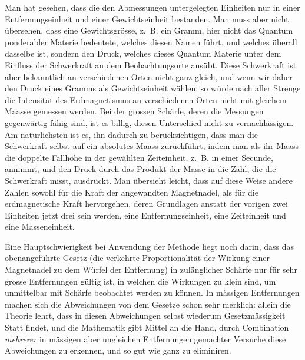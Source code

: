 Man hat gesehen, dass die den Abmessungen untergelegten Einheiten nur in einer Entfernungseinheit und einer Gewichtseinheit bestanden. Man muss aber nicht übersehen, dass eine Gewichtsgrösse, z.~B. ein Gramm, hier nicht das Quantum ponderabler Materie bedeutete, welches diesen Namen führt, und welches überall dasselbe ist, sondern den Druck, welches dieses Quantum Materie unter dem Einfluss der Schwerkraft an dem Beobachtungsorte ausübt. Diese Schwerkraft ist aber bekanntlich an verschiedenen Orten nicht ganz gleich, und wenn wir daher den Druck eines Gramms als Gewichtseinheit wählen, so würde nach aller Strenge die Intensität des Erdmagnetismus an verschiedenen Orten nicht mit gleichem Maasse gemessen werden. Bei der grossen Schärfe, deren die Messungen gegenwärtig fähig sind, ist es billig, diesen Unterschied nicht zu vernachlässigen. Am natürlichsten ist es, ihn dadurch zu berücksichtigen, dass man die Schwerkraft selbst auf ein absolutes Maass zurückführt, indem man als ihr Maass die doppelte Fallhöhe in der gewählten Zeiteinheit, z.~B. in einer Secunde, annimmt, und den Druck durch das Produkt der Masse in die Zahl, die die Schwerkraft misst, ausdrückt. Man übersieht leicht, dass auf diese Weise andere Zahlen sowohl für die Kraft der angewandten Magnetnadel, als für die erdmagnetische Kraft hervorgehen, deren Grundlagen anstatt der vorigen zwei Einheiten jetzt drei sein werden, eine Entfernungseinheit, eine Zeiteinheit und eine Masseneinheit.

\GaussVSourceGathering{42\textsuperscript{*}}
\par\clearpage
{}
Eine Hauptschwierigkeit bei Anwendung der Methode liegt noch darin, dass das obenangeführte Gesetz (die verkehrte Proportionalität der Wirkung einer Magnetnadel zu dem Würfel der Entfernung) in zulänglicher Schärfe nur für sehr grosse Entfernungen gültig ist, in welchen die Wirkungen zu klein sind, um unmittelbar mit Schärfe beobachtet werden zu können. In mässigen Entfernungen machen sich die Abweichungen von dem Gesetze schon sehr merklich: allein die Theorie lehrt, dass in diesen Abweichungen selbst wiederum Gesetzmässigkeit Statt findet, und die Mathematik gibt Mittel an die Hand, durch Combination \textit{mehrerer} in mässigen aber ungleichen Entfernungen gemachter Versuche diese Abweichungen zu erkennen, und so gut wie ganz zu eliminiren.


